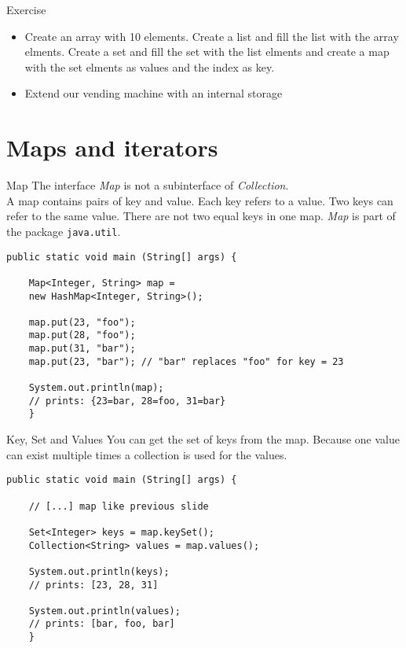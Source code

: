 \begin{frame}{Exercise}
	\begin{itemize}
		\item Create an array with 10 elements. Create a list and fill the list with the array 		elments. Create a set and fill the set with the list elments and create a map with the set elments as values and the index as key.
		\item Extend our vending machine with an internal storage
	\end{itemize}
\end{frame}

\section{Maps and iterators}
\begin{frame}[fragile]{Map}
	The interface \emph{Map} is not a subinterface of \emph{Collection}.\\
	A map contains pairs of key and value. Each key refers to a value. 
	Two keys can refer to the same value. There are not two equal keys in one map.
	\emph{Map} is part of the package \texttt{java.util}.
	\vfill
	\begin{lstlisting}[basicstyle=\ttfamily\scriptsize]
	public static void main (String[] args) {
	
	Map<Integer, String> map = 
	new HashMap<Integer, String>();
	
	map.put(23, "foo");
	map.put(28, "foo");
	map.put(31, "bar");
	map.put(23, "bar"); // "bar" replaces "foo" for key = 23
	
	System.out.println(map);
	// prints: {23=bar, 28=foo, 31=bar}
	}
	\end{lstlisting}
\end{frame}

\begin{frame}[fragile]{Key, Set and Values}
	You can get the set of keys from the map.
	Because one value can exist multiple times a collection is used for the values.
	\begin{lstlisting}[basicstyle=\ttfamily\scriptsize]
	public static void main (String[] args) {
	
	// [...] map like previous slide
	
	Set<Integer> keys = map.keySet();
	Collection<String> values = map.values();
	
	System.out.println(keys);
	// prints: [23, 28, 31]
	
	System.out.println(values);
	// prints: [bar, foo, bar]
	}
	\end{lstlisting}
\end{frame}

